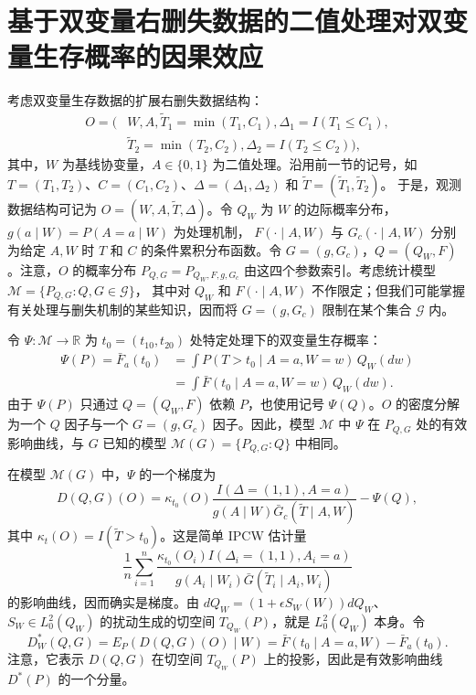 \section{基于双变量右删失数据的二值处理对双变量生存概率的因果效应}

考虑双变量生存数据的扩展右删失数据结构：
\[
 \begin{aligned}
 O=\bigl(&W,A,\widetilde T_1=\min(T_1,C_1),\Delta_1=I(T_1\leq C_1),\\
 &\widetilde T_2=\min(T_2,C_2),\Delta_2=I(T_2\leq C_2)\bigr),
 \end{aligned}
\]
其中，$W$ 为基线协变量，$A\in\{0,1\}$ 为二值处理。沿用前一节的记号，如
$T=(T_1,T_2)$、$C=(C_1,C_2)$、$\Delta=(\Delta_1,\Delta_2)$ 和
$\widetilde T=(\widetilde T_1,\widetilde T_2)$。
于是，观测数据结构可记为 $O=(W,A,\widetilde T,\Delta)$。令 $Q_W$ 为 $W$ 的边际概率分布，
$g(a\mid W)=P(A=a\mid W)$ 为处理机制，
$F(\cdot\mid A,W)$ 与 $G_c(\cdot\mid A,W)$ 分别为给定 $A,W$ 时 $T$ 和 $C$ 的条件累积分布函数。令 $G=(g,G_c)$，$Q=(Q_W,F)$。注意，$O$ 的概率分布
$P_{Q,G}=P_{Q_W,F,g,G_c}$
由这四个参数索引。考虑统计模型
$\mathcal M=\{P_{Q,G}:Q,G\in\mathcal G\}$，
其中对 $Q_W$ 和 $F(\cdot\mid A,W)$ 不作限定；但我们可能掌握有关处理与删失机制的某些知识，因而将 $G=(g,G_c)$ 限制在某个集合 $\mathcal G$ 内。

令 $\Psi:\mathcal M\to\mathbb R$ 为 $t_0=(t_{10},t_{20})$ 处特定处理下的双变量生存概率：
\[
 \begin{aligned}
 \Psi(P)=\bar F_a(t_0)
 &=\int P(T>t_0\mid A=a,W=w)\,Q_W(dw)\\
 &=\int\bar F(t_0\mid A=a,W=w)\,Q_W(dw).
 \end{aligned}
\]
由于 $\Psi(P)$ 只通过 $Q=(Q_W,F)$ 依赖 $P$，也使用记号 $\Psi(Q)$。$O$ 的密度分解为一个 $Q$ 因子与一个 $G=(g,G_c)$ 因子。因此，模型 $\mathcal M$ 中 $\Psi$ 在 $P_{Q,G}$ 处的有效影响曲线，与 $G$ 已知的模型 $\mathcal M(G)=\{P_{Q,G}:Q\}$ 中相同。

在模型 $\mathcal M(G)$ 中，$\Psi$ 的一个梯度为
\[
 D(Q,G)(O)=\kappa_{t_0}(O)
 \frac{I(\Delta=(1,1),A=a)}
 {g(A\mid W)\bar G_c(\widetilde T\mid A,W)}-\Psi(Q),
\]
其中 $\kappa_t(O)=I(\widetilde T>t_0)$。这是简单 IPCW 估计量
\[
 \frac1n\sum_{i=1}^n
 \frac{\kappa_{t_0}(O_i)I(\Delta_i=(1,1),A_i=a)}
 {g(A_i\mid W_i)\bar G(\widetilde T_i\mid A_i,W_i)}
\]
的影响曲线，因而确实是梯度。由
$dQ_W=(1+\epsilon S_W(W))dQ_W$、
$S_W\in L_0^2(Q_W)$
的扰动生成的切空间 $T_{Q_W}(P)$，就是 $L_0^2(Q_W)$ 本身。令
\[
 D_W^*(Q,G)=E_P(D(Q,G)(O)\mid W)
 =\bar F(t_0\mid A=a,W)-\bar F_a(t_0).
\]
注意，它表示 $D(Q,G)$ 在切空间 $T_{Q_W}(P)$ 上的投影，因此是有效影响曲线 $D^*(P)$ 的一个分量。

